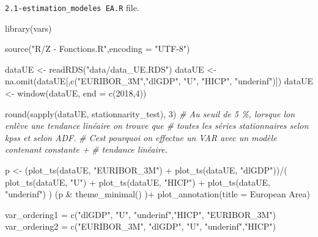 \documentclass[
  11pt,
]{article}
\newenvironment{Shaded}{\begin{snugshade}}{\end{snugshade}}
\newcommand{\AttributeTok}[1]{\textcolor[rgb]{0.77,0.63,0.00}{#1}}
\newcommand{\CommentTok}[1]{\textcolor[rgb]{0.56,0.35,0.01}{\textit{#1}}}
\newcommand{\DecValTok}[1]{\textcolor[rgb]{0.00,0.00,0.81}{#1}}
\newcommand{\FunctionTok}[1]{\textcolor[rgb]{0.00,0.00,0.00}{#1}}
\newcommand{\NormalTok}[1]{#1}
\newcommand{\OtherTok}[1]{\textcolor[rgb]{0.56,0.35,0.01}{#1}}
\newcommand{\SpecialCharTok}[1]{\textcolor[rgb]{0.00,0.00,0.00}{#1}}
\newcommand{\StringTok}[1]{\textcolor[rgb]{0.31,0.60,0.02}{#1}}
\begin{document}
\texttt{2.1-estimation\_modeles\ EA.R} file.

\begin{Shaded}
\begin{Highlighting}[]
\FunctionTok{library}\NormalTok{(vars)}

\FunctionTok{source}\NormalTok{(}\StringTok{"R/Z {-} Fonctions.R"}\NormalTok{,}\AttributeTok{encoding =} \StringTok{"UTF{-}8"}\NormalTok{)}

\NormalTok{dataUE }\OtherTok{\textless{}{-}} \FunctionTok{readRDS}\NormalTok{(}\StringTok{"data/data\_UE.RDS"}\NormalTok{)}
\NormalTok{dataUE }\OtherTok{\textless{}{-}} \FunctionTok{na.omit}\NormalTok{(dataUE[,}\FunctionTok{c}\NormalTok{(}\StringTok{"EURIBOR\_3M"}\NormalTok{,}\StringTok{"dlGDP"}\NormalTok{,}
                            \StringTok{"U"}\NormalTok{, }\StringTok{"HICP"}\NormalTok{, }\StringTok{"underinf"}\NormalTok{)])}
\NormalTok{dataUE }\OtherTok{\textless{}{-}} \FunctionTok{window}\NormalTok{(dataUE, }\AttributeTok{end =} \FunctionTok{c}\NormalTok{(}\DecValTok{2018}\NormalTok{,}\DecValTok{4}\NormalTok{))}

\FunctionTok{round}\NormalTok{(}\FunctionTok{sapply}\NormalTok{(dataUE, stationnarity\_test), }\DecValTok{3}\NormalTok{)}
\CommentTok{\# Au seuil de 5 \%, lorsque l\textquotesingle{}on enlève une tendance linéaire on trouve que}
\CommentTok{\# toutes les séries stationnaires selon kpss et selon ADF.}
\CommentTok{\# C\textquotesingle{}est pourquoi on effectue un VAR avec un modèle contenant constante + }
\CommentTok{\# tendance linéaire.}

\NormalTok{p }\OtherTok{\textless{}{-}}\NormalTok{ (}\FunctionTok{plot\_ts}\NormalTok{(dataUE, }\StringTok{"EURIBOR\_3M"}\NormalTok{) }\SpecialCharTok{+}
          \FunctionTok{plot\_ts}\NormalTok{(dataUE, }\StringTok{"dlGDP"}\NormalTok{))}\SpecialCharTok{/}\NormalTok{(}
              \FunctionTok{plot\_ts}\NormalTok{(dataUE, }\StringTok{"U"}\NormalTok{) }\SpecialCharTok{+} 
                  \FunctionTok{plot\_ts}\NormalTok{(dataUE, }\StringTok{"HICP"}\NormalTok{) }\SpecialCharTok{+} 
                  \FunctionTok{plot\_ts}\NormalTok{(dataUE, }\StringTok{"underinf"}\NormalTok{)}
\NormalTok{              )}
\NormalTok{(p }\SpecialCharTok{\&} \FunctionTok{theme\_minimal}\NormalTok{() )}\SpecialCharTok{+} 
    \FunctionTok{plot\_annotation}\NormalTok{(}\AttributeTok{title =} \StringTok{\textquotesingle{}European Area\textquotesingle{}}\NormalTok{)}

\NormalTok{var\_ordering1 }\OtherTok{=} \FunctionTok{c}\NormalTok{(}\StringTok{"dlGDP"}\NormalTok{,}
                 \StringTok{"U"}\NormalTok{, }\StringTok{"underinf"}\NormalTok{,}\StringTok{"HICP"}\NormalTok{, }\StringTok{"EURIBOR\_3M"}\NormalTok{)}
\NormalTok{var\_ordering2 }\OtherTok{=} \FunctionTok{c}\NormalTok{(}\StringTok{"EURIBOR\_3M"}\NormalTok{, }\StringTok{"dlGDP"}\NormalTok{,}
                 \StringTok{"U"}\NormalTok{, }\StringTok{"underinf"}\NormalTok{,}\StringTok{"HICP"}\NormalTok{)}


\end{Highlighting}
\end{Shaded}
\end{document}
